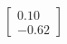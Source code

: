 \documentclass[preview]{standalone}
\begin{document}
\begin{align*}
\begin{bmatrix} 0.10 \\ -0.62 \end{bmatrix}
\end{align*}
\end{document}
